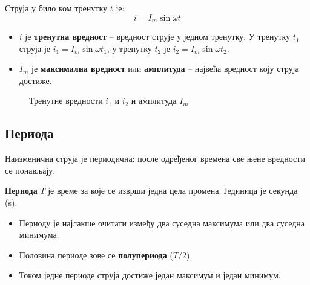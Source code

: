 \documentclass{article}
\begin{document}
Струја у било ком тренутку $t$ је:
\begin{equation}
    i = I_m\sin\omega t
\end{equation}
\begin{itemize}
    \item $i$ је \textbf{тренутна вредност} -- вредност струје у једном тренутку. У тренутку $t_1$ струја је $i_1 = I_m\sin\omega t_1$, у тренутку $t_2$ је $i_2 = I_m\sin\omega t_2$.
    \item $I_m$ је \textbf{максимална вредност} или \textbf{амплитуда} -- највећа вредност коју струја достиже.
\end{itemize}

\begin{figure}[H]
    \centering
    \caption{Тренутне вредности $i_1$ и $i_2$ и амплитуда $I_m$}
    \label{fig:trenutna}
\end{figure}

\subsection{Периода}

Наизменична струја је периодична: после одређеног времена све њене вредности се понављају.

\textbf{Периода} $T$ је време за које се изврши једна цела промена. Јединица је секунда (s).
\begin{itemize}
    \item Периоду је најлакше очитати између два суседна максимума или два суседна минимума.
    \item Половина периоде зове се \textbf{полупериода} ($T/2$).
    \item Током једне периоде струја достиже један максимум и један минимум.
\end{itemize}
\end{document}
